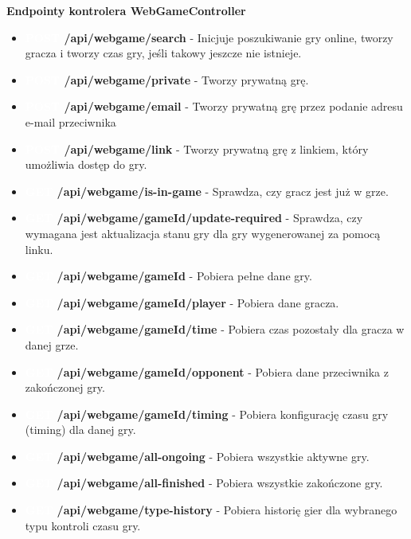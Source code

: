 \documentclass[twoside]{projektInzynierskiMS1}
\begin{document}
\newpage

\noindent  \textbf{Endpointy kontrolera WebGameController}
\begin{itemize} 
    \setlength\itemsep{0cm}
    \item \textbf{\colorbox{green!90}{\textcolor{white}{POST}} /api/webgame/search} - Inicjuje poszukiwanie gry online, tworzy gracza i tworzy czas gry, jeśli takowy jeszcze nie istnieje. 
    \item \textbf{\colorbox{green!90}{\textcolor{white}{POST}} /api/webgame/private} - Tworzy prywatną grę. 
    \item \textbf{\colorbox{green!90}{\textcolor{white}{POST}} /api/webgame/email} - Tworzy prywatną grę przez podanie adresu e-mail przeciwnika 
    \item \textbf{\colorbox{green!90}{\textcolor{white}{POST}} /api/webgame/link} - Tworzy prywatną grę z linkiem, który umożliwia dostęp do gry.
    \item \textbf{\colorbox{cyan!90}{\textcolor{white}{GET}} /api/webgame/is-in-game} - Sprawdza, czy gracz jest już w grze. 
    \item \textbf{\colorbox{cyan!90}{\textcolor{white}{GET}} /api/webgame/{gameId}/update-required} - Sprawdza, czy wymagana jest aktualizacja stanu gry dla gry wygenerowanej za pomocą linku. 
    \item \textbf{\colorbox{cyan!90}{\textcolor{white}{GET}} /api/webgame/{gameId}} - Pobiera pełne dane gry. 
    \item \textbf{\colorbox{cyan!90}{\textcolor{white}{GET}} /api/webgame/{gameId}/player} - Pobiera dane gracza. 
    \item \textbf{\colorbox{cyan!90}{\textcolor{white}{GET}} /api/webgame/{gameId}/time} - Pobiera czas pozostały dla gracza w danej grze. 
    \item \textbf{\colorbox{cyan!90}{\textcolor{white}{GET}} /api/webgame/{gameId}/opponent} - Pobiera dane przeciwnika z zakończonej gry. 
    \item \textbf{\colorbox{cyan!90}{\textcolor{white}{GET}} /api/webgame/{gameId}/timing} - Pobiera konfigurację czasu gry (timing) dla danej gry. 
    \item \textbf{\colorbox{cyan!90}{\textcolor{white}{GET}} /api/webgame/all-ongoing} - Pobiera wszystkie aktywne gry. 
    \item \textbf{\colorbox{cyan!90}{\textcolor{white}{GET}} /api/webgame/all-finished} - Pobiera wszystkie zakończone gry. 
    \item \textbf{\colorbox{cyan!90}{\textcolor{white}{GET}} /api/webgame/type-history} - Pobiera historię gier dla wybranego typu kontroli czasu gry. 

\end{itemize}
\end{document}
